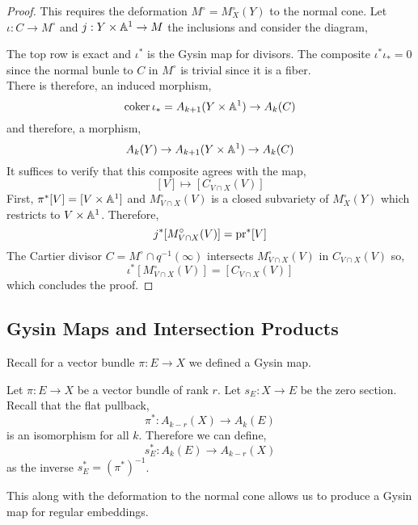 \documentclass[12pt]{article}
\begin{document}
\begin{proof}
This requires the deformation $M^\circ = M^\circ_X(Y)$ to the normal cone. Let $\iota : C \to M^\circ$ and $j : Y \times \mathbb{A}^1 \to M$ the inclusions and consider the diagram,
\begin{center}
\end{center}
The top row is exact and $\iota^*$ is the Gysin map for divisors. The composite $\iota^* \iota_* = 0$ since the normal bunle to $C$ in $M^\circ$ is trivial since it is a fiber.
\bigskip\\
There is therefore, an induced morphism,
\[ \operatorname{\mathrm{coker}}{\iota_*} = A_{k+1}(Y \times \mathbb{A}^1) \to A_k(C) \]
and therefore, a morphism,
\[ A_k(Y) \to A_{k+1}(Y \times \mathbb{A}^1) \to A_k(C) \]
It suffices to verify that this composite agrees with the map,
\[ [V] \mapsto [C_{V \cap X}(V)] \]
First, $\pi^* [V] = [V \times \mathbb{A}^1]$ and $M^\circ_{V \cap X}(V)$ is a closed subvariety of $M^\circ_X(Y)$ which restricts to $V \times \mathbb{A}^1$. Therefore,
\[ j^* [M^\circ_{V \cap X}(V)] = \mathrm{pr}^* [V] \]
The Cartier divisor $C = M^\circ \cap q^{-1}(\infty)$ intersects $M^\circ_{V \cap X}(V)$ in $C_{V \cap X}(V)$ so,
\[ \iota^* [M_{V \cap X}^\circ(V)] = [C_{V \cap X}(V)] \]
which concludes the proof.
\end{proof}

\subsection{Gysin Maps and Intersection Products}

Recall for a vector bundle $\pi : E \to X$ we defined a Gysin map.

\begin{defn}
Let $\pi : E \to X$ be a vector bundle of rank $r$. Let $s_E : X \to E$ be the zero section. Recall that the flat pullback,
\[ \pi^* : A_{k-r}(X) \to A_k(E) \]
is an isomorphism for all $k$. Therefore we can define,
\[ s_E^* : A_k(E) \to A_{k-r}(X) \]
as the inverse $s_E^* = (\pi^*)^{-1}$.
\end{defn}

This along with the deformation to the normal cone allows us to produce a Gysin map for regular embeddings.
\end{document}
